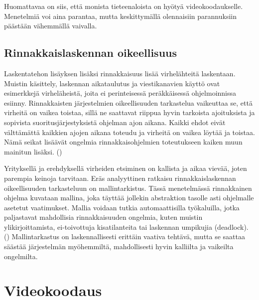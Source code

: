 Huomattavaa on siis, että monista tieteenaloista on hyötyä videokoodaukselle.
Menetelmiä voi aina parantaa, mutta keskittymällä olennaisiin parannuksiin
päästään vähemmällä vaivalla.

\subsection{Rinnakkaislaskennan oikeellisuus}

Laskentatehon lisäyksen lisäksi rinnakkaisuus lisää virhelähteitä laskentaan.
Muistin käsittely, laskennan aikataulutus ja viestikanavien käyttö ovat
esimerkkejä virheläheistä, joita ei perinteisessä peräkkäisessä ohjelmoinnissa
esiinny. Rinnakkaisten järjestelmien oikeellisuuden tarkastelua vaikeuttaa se,
että virheitä on vaikea toistaa, sillä ne saattavat riippua hyvin tarkoista
ajoituksista ja sopivista suoritusjärjestyksistä ohjelman ajon aikana. Kaikki
ehdot eivät välttämättä kaikkien ajojen aikana toteudu ja virheitä on vaikea
löytää ja toistaa. Nämä seikat lisäävät ongelmia rinnakkaisohjelmien
toteutukseen kaiken muun mainitun lisäksi. (\citealt{ari})

Yrityksellä ja erehdyksellä virheiden etsiminen on kallista ja aikaa vievää,
joten parempia keinoja tarvitaan. Eräs analyyttinen ratkaisu
rinnakkaislaskennan oikeellisuuden tarkasteluun on mallintarkistus. Tässä
menetelmässä rinnakkainen ohjelma kuvataan mallina, joka täyttää jollekin
abstraktion tasolle asti ohjelmalle asetetut vaatimukset. Mallia voidaan
tutkia automaattisilla työkaluilla, jotka paljastavat mahdollisia
rinnakkaisuuden ongelmia, kuten muistin ylikirjoittamista, ei-toivottuja
kisatilanteita tai laskennan umpikujia (deadlock). (\citealt{ari})
Mallintarkastus on laskennallisesti erittäin vaativa tehtävä, mutta se saattaa
säästää järjestelmän myöhemmiltä, mahdollisesti hyvin kalliilta ja vaikeilta
ongelmilta.

\newpage

\section{Videokoodaus}

